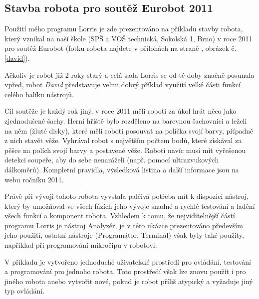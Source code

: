 \documentclass[12pt, a4paper, oneside]{article}
\newcommand{\It}{\textit}  %
\begin{document}
\newpage
\subsection{Stavba robota pro soutěž Eurobot 2011}
Použití mého programu Lorris je zde prezentováno na příkladu stavby robota, který vznikal na naší škole (SPŠ a VOŠ technická, Sokolská 1, Brno) v roce 2011 pro soutěž Eurobot\cite{eurobot} (fotku robota najdete v přílohách na straně \pageref{david}, obrázek č. \ref{david}).

Ačkoliv je robot již 2 roky starý a celá sada Lorris se od té doby značně posunula vpřed, robot \It{David} představuje velmi dobrý příklad využití velké části funkcí celého balíku nástrojů.

Cíl soutěže je každý rok jiný, v roce 2011 měli roboti za úkol hrát něco jako zjednodušené šachy. Herní hřiště bylo rozděleno na barevnou šachovnici a leželi na něm  (žluté disky), které měli roboti posouvat na políčka svojí barvy, případně z nich stavět věže. Vyhrával robot s největším počtem bodů, které získával za pěšce na polích svojí barvy a postavené věže. Roboti navíc musí mít vyřešenou detekci soupeře, aby do sebe nenaráželi (např. pomocí ultrazvukových dálkoměrů). Kompletní pravidla, výsledková listina a další informace jsou na webu ročníku 2011\cite{eurobot11}.

Právě při vývoji tohoto robota vyvstala palčivá potřeba mít k dispozici nástroj, který by umožňoval ve všech fázích jeho vývoje snadné a rychlé testování a ladění všech funkcí a komponent robota. Vzhledem k tomu, že nejviditelnější částí programu Lorris je nástroj Analyzér, je v této ukázce prezentováno především jeho použití, ostatní nástroje (Programátor, Terminál) však byly také použity, například při programování mikročipu v robotovi.

V příkladu je vytvořeno jednoduché uživatelské prostředí pro ovládání, testování a programování pro jednoho robota. Toto prostředí však lze znovu použít i pro jiného robota anebo vytvořit nové, pokud je robot příliš atypický a vyžaduje jiný typ ovládání.


\newpage
\end{document}
